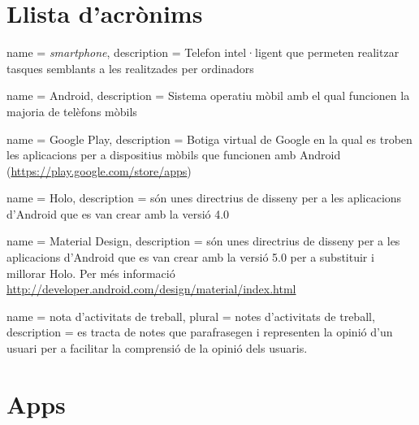 \chapter*{Llista d'acrònims}
\label{sec:glossary}


\begin{acronym}
\end{acronym}




{
name = \textit{smartphone}, description = Telefon intel·ligent que permeten realitzar tasques semblants a les realitzades per ordinadors 
}

{
name = Android, description = Sistema operatiu mòbil amb el qual funcionen la majoria de telèfons mòbils \cite{Android_OS}
}

{
name = Google Play, description = Botiga virtual de Google en la qual es troben les aplicacions per a dispositius mòbils que funcionen amb \gls{Android} (\url{https://play.google.com/store/apps})
}

{
name = Holo, description = són unes directrius de disseny per a les aplicacions d'\gls{Android} que es van crear amb la versió 4.0
}

{
name = Material Design, description = són unes directrius de disseny per a les aplicacions d'Android que es van crear amb la versió 5.0 per a substituir i millorar Holo. Per més informació \url{http://developer.android.com/design/material/index.html}
}

{
name = nota d'activitats de treball, plural = notes d'activitats de treball, description = es tracta de notes que parafrasegen i representen la opinió d'un usuari per a facilitar la comprensió de la opinió dels usuaris.  
}

\printglossary


\chapter*{Apps}
\label{sec:apps}

